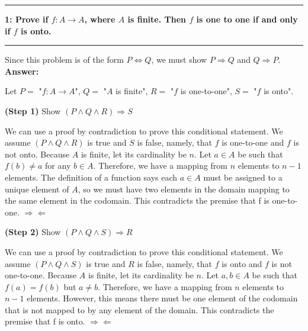 \documentclass[11pt]{article}
\newcommand\question[2]{\vspace{.25in}\hrule\textbf{#1: #2}\vspace{.5em}\hrule\vspace{.10in}}
\renewcommand\part[1]{\vspace{.10in}\textbf{(#1)}}
\newcommand\answer{\vspace{.10in}\textbf{Answer: }}
\begin{document}
\raggedright
\newcommand\NAME{Stewart Dulaney}  %
\newcommand\SID{1545566}     %
\newcommand\HWNUM{4}              %

\question{1}{Prove if $f: A \rightarrow A$, where $A$ is finite. Then $f$ is one to one if and only if $f$ is onto.} 

Since this problem is of the form $P \Leftrightarrow Q$, we must show $P \Rightarrow Q$ and $Q \Rightarrow P$.\\[\baselineskip]

\answer

Let $P =$ "$f: A \rightarrow A$", $Q =$ "$A$ is finite", $R =$ "$f$ is one-to-one", $S  =$ "$f$ is onto".

\part{Step 1} Show $(P \land Q \land R) \Rightarrow S$

We can use a proof by contradiction to prove this conditional statement. We assume $(P \land Q \land R)$ is true and $S$ is false, namely, that $f$ is one-to-one and $f$ is not onto. Because $A$ is finite, let its cardinality be $n$. Let $a \in A$ be such that $f(b) \neq a$ for any $b \in A$. Therefore, we have a mapping from $n$ elements to $n - 1$ elements. The definition of a function says each $a \in A$ must be assigned to a unique element of $A$, so we must have two elements in the domain mapping to the same element in the codomain. This contradicts the premise that f is one-to-one. $\Rightarrow\!\Leftarrow$

\part{Step 2} Show $(P \land Q \land S) \Rightarrow R$

We can use a proof by contradiction to prove this conditional statement. We assume $(P \land Q \land S)$ is true and $R$ is false, namely, that $f$ is onto and $f$ is not one-to-one. Because $A$ is finite, let its cardinality be $n$. Let $a, b \in A$ be such that $f(a) = f(b)$ but $a \neq b$. Therefore, we have a mapping from $n$ elements to $n - 1$ elements. However, this means there must be one element of the codomain that is not mapped to by any element of the domain. This contradicts the premise that f is onto. $\Rightarrow\!\Leftarrow$
\end{document}
